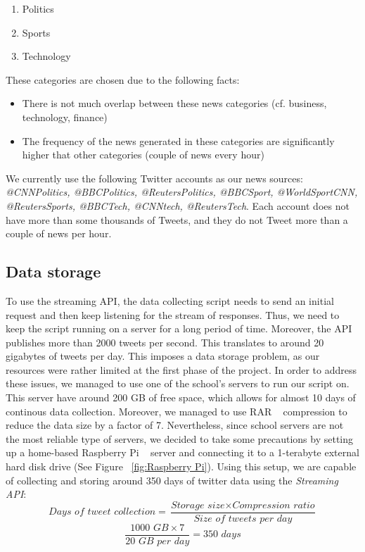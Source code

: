 \documentclass{llncs}
\begin{document}
\begin{enumerate}
  \item Politics
  \item Sports
  \item Technology
\end{enumerate}

These categories are chosen due to the following facts:
\begin{itemize}
  \item There is not much overlap between these news categories (cf. business, technology, finance)
  \item The frequency of the news generated in these categories are significantly higher that other categories (couple of news every hour)
\end{itemize}

We currently use the following Twitter accounts as our news sources: \textit{@CNNPolitics, @BBCPolitics, @ReutersPolitics, @BBCSport, @WorldSportCNN, @ReutersSports, @BBCTech, @CNNtech, @ReutersTech}. Each account does not have more than some thousands of Tweets, and they do not Tweet more than a couple of news per hour.

\subsection{Data storage}
To use the streaming API, the data collecting script needs to send an initial request and then keep listening for the stream of responses. Thus, we need to keep the script running on a server for a long period of time. Moreover, the API publishes more than 2000 tweets per second. This translates to around 20 gigabytes of tweets per day. This imposes a data storage problem, as our resources were rather limited at the first phase of the project. In order to address these issues, we managed to use one of the school's servers to run our script on. This server have around 200 GB of free space, which allows for almost 10 days of continous data collection. Moreover, we managed to use RAR ~\cite{wiki:RAR} compression to reduce the data size by a factor of 7. Nevertheless, since school servers are not the most reliable type of servers, we decided to take some precautions by setting up a home-based Raspberry Pi ~\cite{wiki:raspberrypi} server and connecting it to a 1-terabyte external hard disk drive (See Figure ~\ref{fig:Raspberry Pi}). Using this setup, we are capable of collecting and storing around 350 days of twitter data using the \textit{Streaming API}:
\[\textit{Days of tweet collection}=\frac{\textit{Storage size}\times \textit{Compression ratio}} {\textit{Size of tweets per day}}\]
\[\frac{\textit{1000 GB} \times 7}{\textit{20 GB per day}}=\textit{350 days} \]
\end{document}
